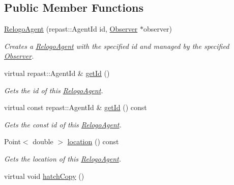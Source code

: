 \subsection*{Public Member Functions}
\begin{DoxyCompactItemize}
\item 
\hyperlink{classrepast_1_1relogo_1_1_relogo_agent_a3a105277ddc72f3087738ebec3cf68e2}{Relogo\-Agent} (repast\-::\-Agent\-Id id, \hyperlink{classrepast_1_1relogo_1_1_observer}{Observer} $\ast$observer)
\begin{DoxyCompactList}\small\item\em Creates a \hyperlink{classrepast_1_1relogo_1_1_relogo_agent}{Relogo\-Agent} with the specified id and managed by the specified \hyperlink{classrepast_1_1relogo_1_1_observer}{Observer}. \end{DoxyCompactList}\item 
virtual repast\-::\-Agent\-Id \& \hyperlink{classrepast_1_1relogo_1_1_relogo_agent_a9df24a6bd58408f501512ee5c0921969}{get\-Id} ()
\begin{DoxyCompactList}\small\item\em Gets the id of this \hyperlink{classrepast_1_1relogo_1_1_relogo_agent}{Relogo\-Agent}. \end{DoxyCompactList}\item 
virtual const repast\-::\-Agent\-Id \& \hyperlink{classrepast_1_1relogo_1_1_relogo_agent_addc5c801304c04233158c731fffa6e0b}{get\-Id} () const 
\begin{DoxyCompactList}\small\item\em Gets the const id of this \hyperlink{classrepast_1_1relogo_1_1_relogo_agent}{Relogo\-Agent}. \end{DoxyCompactList}\item 
Point$<$ double $>$ \hyperlink{classrepast_1_1relogo_1_1_relogo_agent_a12632fc6c21f34dc1552a1d46d7d1000}{location} () const 
\begin{DoxyCompactList}\small\item\em Gets the location of this \hyperlink{classrepast_1_1relogo_1_1_relogo_agent}{Relogo\-Agent}. \end{DoxyCompactList}\item 
\hypertarget{classrepast_1_1relogo_1_1_relogo_agent_ad15d6628284018cf9d729a0d9953d5cb}{virtual void \hyperlink{classrepast_1_1relogo_1_1_relogo_agent_ad15d6628284018cf9d729a0d9953d5cb}{hatch\-Copy} ()}\label{classrepast_1_1relogo_1_1_relogo_agent_ad15d6628284018cf9d729a0d9953d5cb}


\end{DoxyCompactItemize}
